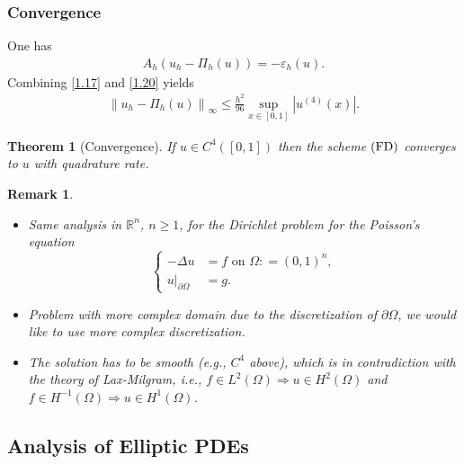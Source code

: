 \documentclass[11pt,a4paper,center,notitlepage]{article}
\numberwithin{equation}{section}
\newtheorem{theorem}{Theorem}[section]
\newtheorem{remark}{Remark}[section]
\begin{document}
\subsubsection{Convergence}
One has
\begin{align}
{A_h}\left( {{u_h} - {\Pi _h}\left( u \right)} \right) =  - {\varepsilon _h}\left( u \right).
\end{align}
Combining \eqref{1.17} and \eqref{1.20} yields
\begin{align}
{\left\| {{u_h} - {\Pi _h}\left( u \right)} \right\|_\infty } \le \frac{{{h^2}}}{{96}}\mathop {\sup }\limits_{x \in \left[ {0,1} \right]} \left| {{u^{\left( 4 \right)}}\left( x \right)} \right|.
\end{align}
\begin{theorem}[Convergence]
If $u \in C^4 \left( \left[0,1\right]\right)$ then the scheme $\left( {\rm FD}\right)$ converges to $u$ with quadrature rate.
\end{theorem}
\begin{remark}
\begin{itemize}
\item Same analysis in $\mathbb{R}^n$, $n\ge 1$, for the Dirichlet problem for the Poisson's equation
\begin{equation}
\left\{ \begin{split}
 - \Delta u &= f \mbox{ on } \Omega : = {\left( {0,1} \right)^n},\\
{\left. u \right|_{\partial \Omega }} &= g.
\end{split} \right.
\end{equation}
\item Problem with more complex domain due to the discretization of $\partial \Omega$, we would like to use more complex discretization.
\item The solution has to be smooth (e.g., $C^4$ above), which is in contradiction with the theory of Lax-Milgram, i.e., $f \in {L^2}\left( \Omega  \right) \Rightarrow u \in {H^2}\left( \Omega  \right)$ and $f \in {H^{ - 1}}\left( \Omega  \right) \Rightarrow u \in {H^1}\left( \Omega  \right)$.
\end{itemize}
\end{remark}
\subsection{Analysis of Elliptic PDEs} 
\end{document}
